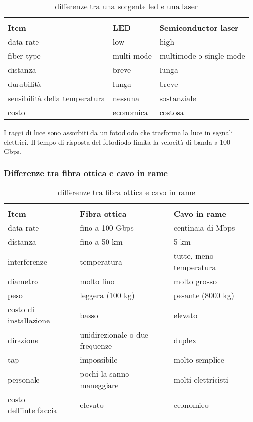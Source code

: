 \documentclass{article}
\begin{document}
\begin{table}[ht]
	\label{sorgenti_luminose}
	\centering
	\begin{tabular}{|l|l|l|}
		\hline
		& & \\
		\textbf{Item} & \textbf{LED} & \textbf{Semiconductor laser} \\
		\hline
		data rate & low & high \\
		fiber type & multi-mode & multimode o single-mode \\
		distanza & breve & lunga \\
		durabilità & lunga & breve \\
		sensibilità della temperatura & nessuna & sostanziale \\
		costo & economica & costosa \\
		\hline
	\end{tabular}
	\caption{differenze tra una sorgente led e una laser}
\end{table}

I raggi di luce sono assorbiti da un fotodiodo che trasforma la luce in segnali
elettrici. Il tempo di risposta del fotodiodo limita la velocità di banda a 100
Gbps.\\

\subsubsection{Differenze tra fibra ottica e cavo in rame}

\begin{table}[ht]
	\label{ottica_rame}
	\centering
	\begin{tabular}{|l|l|l|}
		\hline
		& & \\
		 \textbf{Item} & \textbf{Fibra ottica} & \textbf{Cavo in rame} \\
		 \hline
		 data rate & fino a 100 Gbps & centinaia di Mbps \\
		 distanza & fino a 50 km & 5 km \\
		 interferenze & temperatura & tutte, meno temperatura \\
		 diametro & molto fino & molto grosso \\
		 peso & leggera (100 kg) & pesante (8000 kg) \\
		 costo di installazione & basso & elevato \\
		 direzione & unidirezionale o due frequenze & duplex \\
		 tap & impossibile & molto semplice \\
		 personale & pochi la sanno maneggiare & molti elettricisti \\
		 costo dell'interfaccia & elevato & economico \\
		 \hline
	\end{tabular}
	\caption{differenze tra fibra ottica e cavo in rame}
\end{table}
\end{document}
